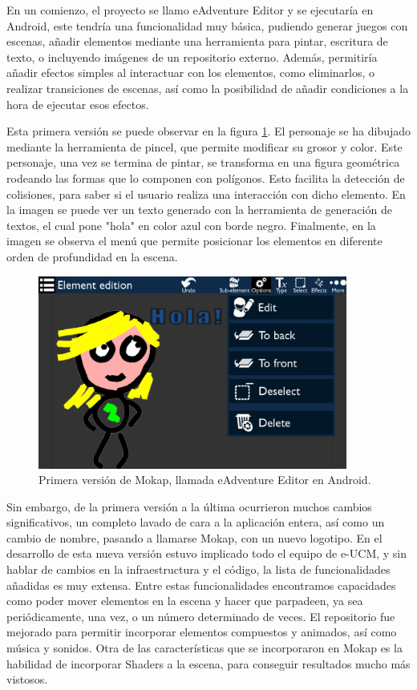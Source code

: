 En un comienzo, el proyecto se llamo eAdventure Editor y se ejecutaría en Android, este tendría una funcionalidad muy básica, pudiendo generar juegos con escenas, añadir elementos mediante una herramienta para pintar, escritura de texto, o incluyendo imágenes de un repositorio externo. Además, permitiría añadir efectos simples al interactuar con los elementos, como eliminarlos, o realizar transiciones de escenas, así como la posibilidad de añadir condiciones a la hora de ejecutar esos efectos.

Esta primera versión se puede observar en la figura \ref{mokap1}. El personaje se ha dibujado mediante la herramienta de pincel, que permite modificar su grosor y color. Este personaje, una vez se termina de pintar, se transforma en una figura geométrica rodeando las formas que lo componen con polígonos. Esto facilita la detección de colisiones, para saber si el usuario realiza una interacción con dicho elemento. En la imagen se puede ver un texto generado con la herramienta de generación de textos, el cual pone "hola" en color azul con borde negro. Finalmente, en la imagen se observa el menú que permite posicionar los elementos en diferente orden de profundidad en la escena.

\begin{figure}[htb]
	\centerline{\includegraphics[height=2.5in]{figures/mokap1.png}}
	\caption[Mokap - eAdventure Editor]{Primera versión de Mokap, llamada eAdventure Editor en Android.}
	\label{mokap1}
\end{figure}

Sin embargo, de la primera versión a la última ocurrieron muchos cambios significativos, un completo lavado de cara a la aplicación entera, así como un cambio de nombre, pasando a llamarse Mokap, con un nuevo logotipo. En el desarrollo de esta nueva versión estuvo implicado todo el equipo de e-UCM, y sin hablar de cambios en la infraestructura y el código, la lista de funcionalidades añadidas es muy extensa. Entre estas funcionalidades encontramos capacidades como poder mover elementos en la escena y hacer que parpadeen, ya sea periódicamente, una vez, o un número determinado de veces. El repositorio fue mejorado para permitir incorporar elementos compuestos y animados, así como música y sonidos. Otra de las características que se incorporaron en Mokap es la habilidad de incorporar Shaders a la escena, para conseguir resultados mucho más vistosos.


